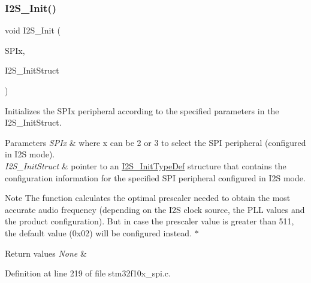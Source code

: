 \subsubsection{\texorpdfstring{I2\+S\+\_\+\+Init()}{I2S\_Init()}}
{\footnotesize\ttfamily void I2\+S\+\_\+\+Init (\begin{DoxyParamCaption}\item[{\hyperlink{struct_s_p_i___type_def}{S\+P\+I\+\_\+\+Type\+Def} $\ast$}]{S\+P\+Ix,  }\item[{\hyperlink{struct_i2_s___init_type_def}{I2\+S\+\_\+\+Init\+Type\+Def} $\ast$}]{I2\+S\+\_\+\+Init\+Struct }\end{DoxyParamCaption})}



Initializes the S\+P\+Ix peripheral according to the specified parameters in the I2\+S\+\_\+\+Init\+Struct. 


\begin{DoxyParams}{Parameters}
{\em S\+P\+Ix} & where x can be 2 or 3 to select the S\+PI peripheral (configured in I2S mode). \\
\hline
{\em I2\+S\+\_\+\+Init\+Struct} & pointer to an \hyperlink{struct_i2_s___init_type_def}{I2\+S\+\_\+\+Init\+Type\+Def} structure that contains the configuration information for the specified S\+PI peripheral configured in I2S mode. \\
\hline
\end{DoxyParams}
\begin{DoxyNote}{Note}
The function calculates the optimal prescaler needed to obtain the most accurate audio frequency (depending on the I2S clock source, the P\+LL values and the product configuration). But in case the prescaler value is greater than 511, the default value (0x02) will be configured instead. $\ast$ 
\end{DoxyNote}

\begin{DoxyRetVals}{Return values}
{\em None} & \\
\hline
\end{DoxyRetVals}


Definition at line 219 of file stm32f10x\+\_\+spi.\+c.


